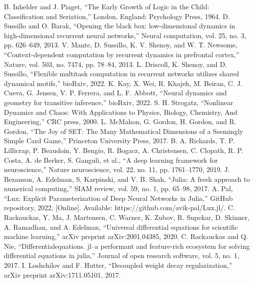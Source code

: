 \documentclass[conference]{IEEEtran}
\begin{document}
\begin{thebibliography}{00}
 B. Inhelder and J. Piaget, ``The Early Growth of Logic in the Child: Classification and Seriation,'' London, England: Psychology Press, 1964.
 D. Sussillo and O. Barak, ``Opening the black box: low-dimensional dynamics in high-dimensional recurrent neural networks,'' Neural computation, vol. 25, no. 3, pp. 626--649, 2013.
 V. Mante, D. Sussillo, K. V. Shenoy, and W. T. Newsome, ``Context-dependent computation by recurrent dynamics in prefrontal cortex,'' Nature, vol. 503, no. 7474, pp. 78--84, 2013.
 L. Driscoll, K. Shenoy, and D. Sussillo, ``Flexible multitask computation in recurrent networks utilizes shared dynamical motifs,'' bioRxiv, 2022.
 K. Kay, X. Wei, R. Khajeh, M. Beiran, C. J. Cueva, G. Jensen, V. P. Ferrera, and L. F. Abbott, ``Neural dynamics and geometry for transitive inference,'' bioRxiv, 2022.
 S. H. Strogatz, ``Nonlinear Dynamics and Chaos: With Applications to Physics, Biology, Chemistry, And Engineering,'' CRC press, 2000.
 L. McMahon, G. Gordon, H. Gordon, and R. Gordon, ``The Joy of SET: The Many Mathematical Dimensions of a Seemingly Simple Card Game,'' Princeton University Press, 2017.
 B. A. Richards, T. P. Lillicrap, P. Beaudoin, Y. Bengio, R. Bogacz, A. Christensen, C. Clopath, R. P. Costa, A. de Berker, S. Ganguli, et al., ``A deep learning framework for neuroscience,'' Nature neuroscience, vol. 22, no. 11, pp. 1761--1770, 2019.
 J. Bezanson, A. Edelman, S. Karpinski, and V. B. Shah, ``Julia: A fresh approach to numerical computing,'' SIAM review, vol. 59, no. 1, pp. 65--98, 2017.
 A. Pal, ``Lux: Explicit Parameterization of Deep Neural Networks in Julia,'' GitHub repository, 2022, [Online]. Available: https://github.com/avik-pal/Lux.jl/.
 C. Rackauckas, Y. Ma, J. Martensen, C. Warner, K. Zubov, R. Supekar, D. Skinner, A. Ramadhan, and A. Edelman, ``Universal differential equations for scientific machine learning,'' arXiv preprint arXiv:2001.04385, 2020.
 C. Rackauckas and Q. Nie, ``Differentialequations. jl--a performant and feature-rich ecosystem for solving differential equations in julia,'' Journal of open research software, vol. 5, no. 1, 2017.
 I. Loshchilov and F. Hutter, ``Decoupled weight decay regularization,'' arXiv preprint arXiv:1711.05101, 2017.

\end{thebibliography}
\end{document}
